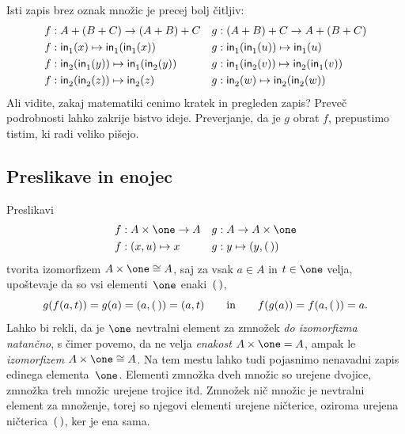 %
Isti zapis brez oznak množic je precej bolj čitljiv:
%
\begin{align*}
  f &:  A + (B + C) \to (A + B) + C &
  g &: (A + B) + C \to A + (B + C) \\
  f &: \inl(x)             \mapsto \inl(\inl(x)) &
  g &: \inl(\inl(u)) \mapsto \inl(u)\\
  f &: \inr(\inl(y)) \mapsto \inl(\inr(y)) &
  g &: \inl(\inr(v)) \mapsto \inr(\inl(v))  \\
  f &: \inr(\inr(z)) \mapsto \inr(z) &
  g &: \inr(w)              \mapsto \inr(\inr(w))
\end{align*}
%
Ali vidite, zakaj matematiki cenimo kratek in pregleden zapis? Preveč podrobnosti lahko
zakrije bistvo ideje. Preverjanje, da je $g$ obrat $f$, prepustimo tistim, ki radi veliko
pišejo.

\subsection{Preslikave in enojec}
\label{sec:preslikave-enojec}

Preslikavi
%
\begin{align*}
  f &: A \times \one \to A &
  g &: A \to A \times \one \\
  f &: (x, u) \mapsto x &
  g &: y \mapsto (y, \unit)
\end{align*}
%
tvorita izomorfizem $A \times \one \cong A$, saj za vsak $a \in A$ in $t \in \one$ velja,
upoštevaje da so vsi elementi~$\one$ enaki~$(\,)$,
%
\begin{equation*}
  g(f(a, t)) = g(a) = (a, (\,)) = (a, t)
  \qquad\text{in}\qquad
  f(g(a)) = f(a, (\,)) = a.
\end{equation*}
%
Lahko bi rekli, da je $\one$ nevtralni element za zmnožek \emph{do izomorfizma natančno},
s čimer povemo, da ne velja \emph{enakost} $A \times \one = A$, ampak le
\emph{izomorfizem} $A \times \one \cong A$. Na tem mestu lahko tudi pojasnimo nenavadni
zapis edinega elementa~$\one$. Elementi zmnožka dveh množic so urejene dvojice, zmnožka
treh množic urejene trojice itd. Zmnožek nič množic je nevtralni element za množenje,
torej so njegovi elementi urejene ničterice, oziroma urejena ničterica~$(\,)$, ker je ena
sama.

